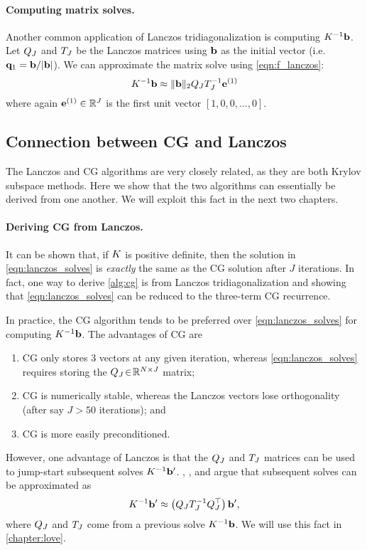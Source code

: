 \paragraph{Computing matrix solves.}
Another common application of Lanczos tridiagonalization is computing $K^{-1} \mathbf{b}$.
Let $Q_J$ and $T_J$ be the Lanczos matrices using $\mathbf{b}$ as the initial vector (i.e. $\mathbf{q}_1 = \mathbf{b} / \vert \mathbf{b} \vert$).
We can approximate the matrix solve using \cref{eqn:f_lanczos}:
%
\begin{equation}
  K^{-1} \mathbf{b} \approx \Vert \mathbf{b} \Vert_2 Q_J T_J^{-1} \mathbf{e}^{(1)}
  \label{eqn:lanczos_solves}
\end{equation}
%
where again $\mathbf{e}^{(1)} \in \mathbb{R}^J$ is the first unit vector $[1, 0, 0, \ldots, 0]$.




\subsection{Connection between CG and Lanczos}
\label{sec:cg_lanczos_connection}

The Lanczos and CG algorithms are very closely related, as they are both Krylov subspace methods.
Here we show that the two algorithms can essentially be derived from one another.
We will exploit this fact in the next two chapters.

\paragraph{Deriving CG from Lanczos.}
It can be shown that, if $K$ is positive definite, then the solution in \cref{eqn:lanczos_solves} is \emph{exactly} the same as the CG solution after $J$ iterations.
In fact, one way to derive \cref{alg:cg} is from Lanczos tridiagonalization and showing that \cref{eqn:lanczos_solves} can be reduced to the three-term CG recurrence.

In practice, the CG algorithm tends to be preferred over \cref{eqn:lanczos_solves} for computing $K^{-1} \mathbf{b}$.
The advantages of CG are
\begin{enumerate}
  \item CG only stores 3 vectors at any given iteration, whereas \cref{eqn:lanczos_solves} requires storing the $Q_J \! \in \! \mathbb{R}^{N \times J}$ matrix;
  \item CG is numerically stable, whereas the Lanczos vectors lose orthogonality (after say $J > 50$ iterations); and
  \item CG is more easily preconditioned.
\end{enumerate}
However, one advantage of Lanczos is that the $Q_J$ and $T_J$ matrices can be used to jump-start subsequent solves $K^{-1} \mathbf{b}'$.
\citet{parlett1980new}, \citet{saad1987lanczos}, and \citet{schneider2001krylov} argue that subsequent solves can be approximated as
%
\begin{equation}
  K^{-1} \mathbf{b}' \approx \left( Q_J T_J^{-1} Q_J^\top \right) \mathbf{b}',
  \label{eqn:lanczos_solve}
\end{equation}
%
where $Q_J$ and $T_J$ come from a previous solve $K^{-1} \mathbf{b}$.
We will use this fact in \cref{chapter:love}.

